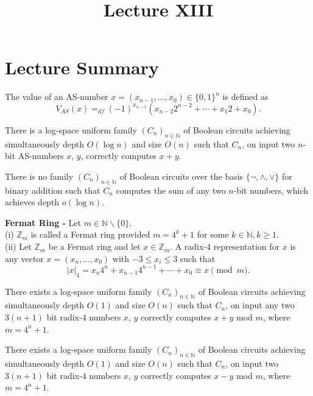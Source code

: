 \documentclass[a4paper]{article}
\title{\vspace{-2cm}Lecture XIII\vspace{-2cm}}
\date{}
\begin{document}
\maketitle
\section{Lecture Summary}
\begin{definition}
The value of an AS-number $x = (x_{n-1}, \ldots, x_{0}) \in \{ 0, 1 \}^{n}$ is defined as
$$V_{AS}(x) =_{df} (-1)^{x_{n-1}}(x_{n-2}2^{n-2} + \cdots + x_{1}2 + x_{0}).$$
\end{definition}


\begin{theorem}
There is a log-space uniform family $(C_{n})_{n \in \mathbb{N}}$ of Boolean circuits achieving simultaneously depth $O(\log{n})$ and size $O(n)$ such that $C_{n}$, on input two $n$-bit AS-numbers $x$, $y$, correctly computes $x + y$.
\end{theorem}


\begin{theorem}
There is no family $(C_{n})_{n \in \mathbb{N}}$ of Boolean circuits over the basis $\{ \lnot, \land, \lor \}$ for binary addition such that $C_{n}$ computes the sum of any two $n$-bit numbers, which achieves depth $o(\log{n})$.
\end{theorem}


\begin{definition}
\textbf{Fermat Ring -} Let $m \in \mathbb{N} \backslash \{ 0 \}$. \\
(i) $\mathbb{Z}_{m}$ is called a Fermat ring provided $m = 4^{k} + 1$ for some $k \in \mathbb{N}, k \geq 1$. \\
(ii) Let $\mathbb{Z}_{m}$ be a Fermat ring and let $x \in \mathbb{Z}_{m}$. A radix-$4$ representation for $x$ is any vector $x = (x_{n}, \ldots, x_{0})$ with $-3 \leq x_{i} \leq 3$ such that 
$$|x|_{4} = x_{n}4^{n} + x_{n - 1}4^{n - 1} + \cdots + x_{0} \equiv x \pmod{m}.$$
\end{definition}


\begin{theorem}
There exists a log-space uniform family $(C_{n})_{n \in \mathbb{N}}$ of Boolean circuits achieving simultaneously depth $O(1)$ and size $O(n)$ such that $C_{n}$, on input any two $3(n + 1)$ bit radix-$4$ numbers $x$, $y$ correctly computes $x + y$ mod $m$, where $m = 4^{n} + 1$.
\end{theorem}


\begin{corollary}
There exists a log-space uniform family $(C_{n})_{n \in \mathbb{N}}$ of Boolean circuits achieving simultaneously depth $O(1)$ and size $O(n)$ such that $C_{n}$, on input two $3(n + 1)$ bit radix-$4$ numbers $x$, $y$ correctly computes $x - y$ mod $m$, where $m = 4^{n} + 1$.
\end{corollary}
\end{document}
